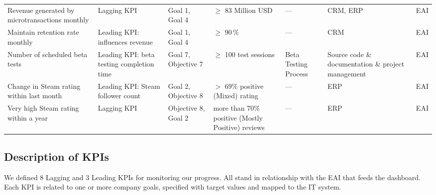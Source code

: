 \documentclass{article}
\begin{document}
{\begin{longtable}{
  L{0.19\textwidth}
  L{0.15\textwidth}
  L{0.13\textwidth}
  L{0.17\textwidth}
  L{0.14\textwidth}
  L{0.17\textwidth}
  L{0.11\textwidth}
}
Revenue generated by microtransactions monthly
& Lagging KPI
& Goal 1, Goal 4
& $\geq$ 83 Million USD
& ---
& CRM, ERP
& EAI \\

Maintain retention rate monthly
& Leading KPI: influences revenue
& Goal 1, Goal 4
& $\geq$ 90\,\%
& ---
& CRM
& EAI \\

Number of scheduled beta tests
& Leading KPI: beta testing completion time
& Goal 7, Objective 7
& $\geq$ 100 test sessions
& Beta Testing Process
& Source code \& documentation \& project management
& EAI \\

Change in Steam rating within last month
& Leading KPI: Steam follower count
& Goal 2, Objective 8
& $>$ 69\% positive (Mixed) rating
& ---
& ERP
& EAI \\

Very high Steam rating within a year
& Lagging KPI
& Objective 8, Goal 2
& more than 70\% positive (Mostly Positive) reviews
& ---
& ERP
& EAI \\

\end{longtable}
}

\subsection{Description of KPIs}

We defined 8 Lagging and 3 Leading KPIs for monitoring our progress. All stand in relationship with the EAI that feeds the dashboard.
Each KPI is related to one or more company goals, specified with target values and mapped to the IT system.
\end{document}
